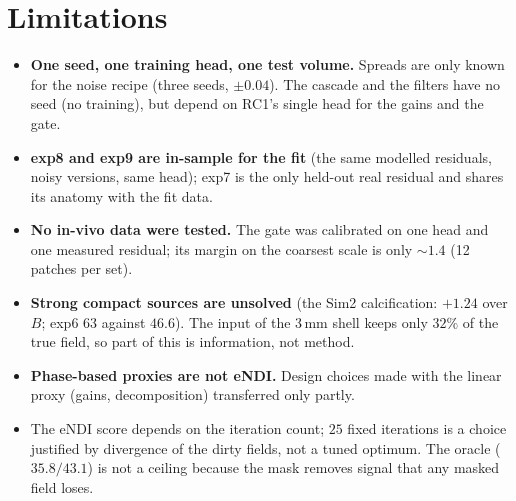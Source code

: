 \documentclass[11pt]{article}
\begin{document}
\section{Limitations}\label{sec:limits}
\begin{itemize}[leftmargin=1.5em,itemsep=1pt]
\item \textbf{One seed, one training head, one test volume.} Spreads are only known for the noise recipe (three seeds, $\pm0.04$). The cascade and the filters have no seed (no training), but depend on RC1's single head for the gains and the gate.
\item \textbf{exp8 and exp9 are in-sample for the fit} (the same modelled residuals, noisy versions, same head); exp7 is the only held-out real residual and shares its anatomy with the fit data.
\item \textbf{No in-vivo data were tested.} The gate was calibrated on one head and one measured residual; its margin on the coarsest scale is only $\sim1.4$ (12 patches per set).
\item \textbf{Strong compact sources are unsolved} (the Sim2 calcification: $+1.24$ over $B$; exp6 $63$ against $46.6$). The input of the 3\,mm shell keeps only $32\%$ of the true field, so part of this is information, not method.
\item \textbf{Phase-based proxies are not eNDI.} Design choices made with the linear proxy (gains, decomposition) transferred only partly.
\item The eNDI score depends on the iteration count; $25$ fixed iterations is a choice justified by divergence of the dirty fields, not a tuned optimum. The oracle ($35.8/43.1$) is not a ceiling because the mask removes signal that any masked field loses.
\end{itemize}
\end{document}
